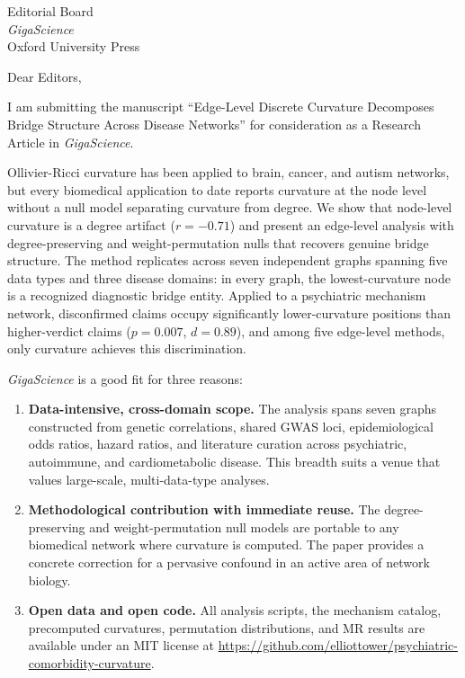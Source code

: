 \documentclass[11pt]{letter}
\begin{document}
\begin{letter}{Editorial Board \\ \emph{GigaScience} \\ Oxford University Press}

\opening{Dear Editors,}

I am submitting the manuscript ``Edge-Level Discrete Curvature Decomposes Bridge Structure Across Disease Networks'' for consideration as a Research Article in \emph{GigaScience}.

Ollivier-Ricci curvature has been applied to brain, cancer, and autism networks, but every biomedical application to date reports curvature at the node level without a null model separating curvature from degree. We show that node-level curvature is a degree artifact ($r = -0.71$) and present an edge-level analysis with degree-preserving and weight-permutation nulls that recovers genuine bridge structure. The method replicates across seven independent graphs spanning five data types and three disease domains: in every graph, the lowest-curvature node is a recognized diagnostic bridge entity. Applied to a psychiatric mechanism network, disconfirmed claims occupy significantly lower-curvature positions than higher-verdict claims ($p = 0.007$, $d = 0.89$), and among five edge-level methods, only curvature achieves this discrimination.

\emph{GigaScience} is a good fit for three reasons:

\begin{enumerate}
\item \textbf{Data-intensive, cross-domain scope.} The analysis spans seven graphs constructed from genetic correlations, shared GWAS loci, epidemiological odds ratios, hazard ratios, and literature curation across psychiatric, autoimmune, and cardiometabolic disease. This breadth suits a venue that values large-scale, multi-data-type analyses.

\item \textbf{Methodological contribution with immediate reuse.} The degree-preserving and weight-permutation null models are portable to any biomedical network where curvature is computed. The paper provides a concrete correction for a pervasive confound in an active area of network biology.

\item \textbf{Open data and open code.} All analysis scripts, the mechanism catalog, precomputed curvatures, permutation distributions, and MR results are available under an MIT license at \url{https://github.com/elliottower/psychiatric-comorbidity-curvature}.
\end{enumerate}


\end{letter}
\end{document}
